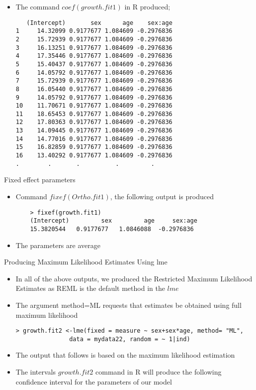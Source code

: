 \documentclass{beamer}
\begin{document}
{\begin{frame}[fragile]
\begin{itemize}
	\item The command $coef(growth.fit1)$ in R produced;
\begin{verbatim}
   (Intercept)       sex      age    sex:age
1     14.32099 0.9177677 1.084609 -0.2976836
2     15.72939 0.9177677 1.084609 -0.2976836
3     16.13251 0.9177677 1.084609 -0.2976836
4     17.35446 0.9177677 1.084609 -0.2976836
5     15.40437 0.9177677 1.084609 -0.2976836
6     14.05792 0.9177677 1.084609 -0.2976836
7     15.72939 0.9177677 1.084609 -0.2976836
8     16.05440 0.9177677 1.084609 -0.2976836
9     14.05792 0.9177677 1.084609 -0.2976836
10    11.70671 0.9177677 1.084609 -0.2976836
11    18.65453 0.9177677 1.084609 -0.2976836
12    17.80363 0.9177677 1.084609 -0.2976836
13    14.09445 0.9177677 1.084609 -0.2976836
14    14.77016 0.9177677 1.084609 -0.2976836
15    16.82859 0.9177677 1.084609 -0.2976836
16    13.40292 0.9177677 1.084609 -0.2976836
.        .       .          .         .
\end{verbatim}
\end{itemize}
\end{frame}
}

\begin{frame}[fragile]{Fixed effect parameters}
\begin{itemize}
	\item Command $fixef(Ortho.fit1)$, the following output is produced 
	\begin{verbatim}
	> fixef(growth.fit1)
	(Intercept)         sex         age     sex:age 
	15.3820544   0.9177677   1.0846088  -0.2976836 
	\end{verbatim}
	\item The parameters are average
\end{itemize}
\end{frame}

\begin{frame}[fragile]{Producing Maximum Likelihood Estimates Using lme}
\begin{itemize}
\item In all of the above outputs, we produced the Restricted Maximum Likelihood Estimates as REML is the default method in the $lme$
\item The argument method=ML requests that estimates be obtained using full maximum likelihood 
\begin{verbatim}
> growth.fit2 <-lme(fixed = measure ~ sex+sex*age, method= "ML",
               data = mydata22, random = ~ 1|ind)
\end{verbatim}
\item The output that follows is based on the maximum likelihood estimation 
\item The intervals $growth.fit2$ command in R will produce the following confidence interval for the parameters of our model
\end{itemize}
\end{frame}
\end{document}
